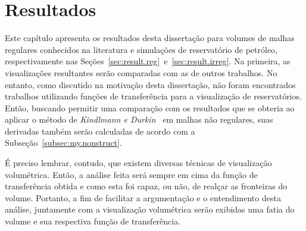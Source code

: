 
\chapter{Resultados}
\label{ch:result}

	Este capítulo apresenta os resultados desta dissertação para volumes de malhas regulares conhecidos na literatura e simulações de reservatório de petróleo, respectivamente nas Seções~\ref{sec:result.reg}~e~\ref{sec:result.irreg}. Na primeira, as visualizações resultantes serão comparadas com as de outros trabalhos. No entanto, como discutido na motivação desta dissertação, não foram encontrados trabalhos utilizando funções de transferência para a visualização de reservatórios. Então, buscando permitir uma comparação com os resultados que se obteria ao aplicar o método de \textit{Kindlmann e Durkin}~\cite{gordon} em malhas não regulares, suas derivadas também serão calculadas de acordo com a Subseção~\ref{subsec:my.nonstruct}.
	
	É preciso lembrar, contudo, que existem diversas técnicas de visualização volumétrica. Então, a análise feita será sempre em cima da função de transferência obtida e como esta foi capaz, ou não, de realçar as fronteiras do volume. Portanto, a fim de facilitar a argumentação e o entendimento desta análise, juntamente com a visualização volumétrica serão exibidas uma fatia do volume e sua respectiva função de transferência.
	
